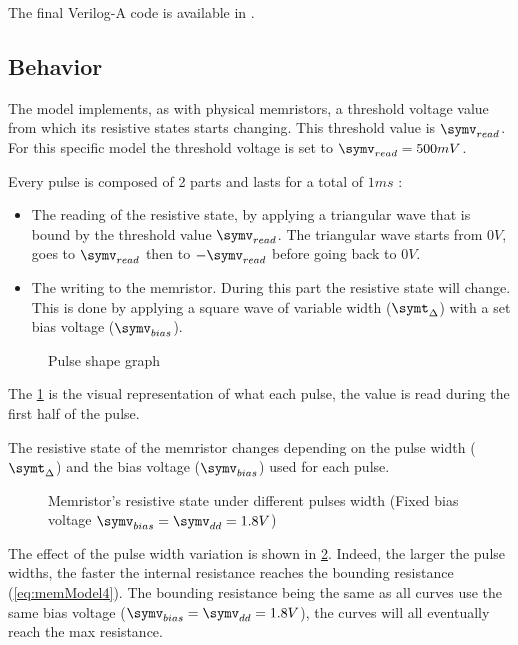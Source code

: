 The final Verilog-A code is available in \cite{memCadenceModel}.

\subsection{Behavior}\label{subsec:memModelBehave}

The model implements, as with physical memristors, a threshold voltage value from which its resistive states starts changing. This threshold value is $\symv_{read}$. For this specific model the threshold voltage is set to $\symv_{read}=500mV$.

Every pulse is composed of 2 parts and lasts for a total of $1 ms$ :
\begin{itemize}
  \item The reading of the resistive state, by applying a triangular wave that is bound by the threshold value $\symv_{read}$. The triangular wave starts from $0V$, goes to $\symv_{read}$ then to $-\symv_{read}$ before going back to $0V$.
  \item The writing to the memristor. During this part the resistive state will change. This is done by applying a square wave of variable width ($\symt_{\Delta}$) with a set bias voltage ($\symv_{bias}$).
\end{itemize}

\begin{figure}[H]
  \centering
  
  \caption{Pulse shape graph}
  \label{graph:memInput}
\end{figure}

The \cref{graph:memInput} is the visual representation of what each pulse, the value is read during the first half of the pulse.

The resistive state of the memristor changes depending on the pulse width ($\symt_{\Delta}$) and the bias voltage ($\symv_{bias}$) used for each pulse.

\begin{figure}[H]
  \centering
  
  \caption{Memristor's resistive state under different pulses width (Fixed bias voltage $\symv_{bias}=\symv_{dd}=1.8V$)}
  \label{graph:pulseChange}
\end{figure}

The effect of the pulse width variation is shown in \cref{graph:pulseChange}. Indeed, the larger the pulse widths, the faster the internal resistance reaches the bounding resistance (\cref{eq:memModel4}). The bounding resistance being the same as all curves use the same bias voltage ($\symv_{bias}=\symv_{dd}=1.8V$), the curves will all eventually reach the max resistance.

